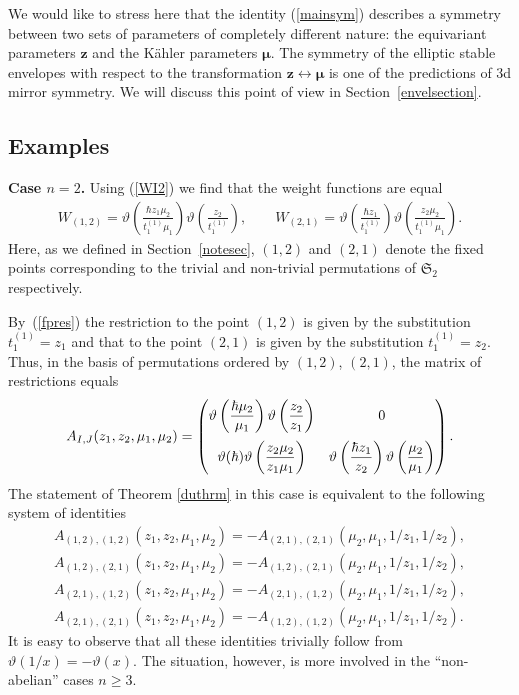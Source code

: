 \documentclass[10pt,a4paper]{amsart}
\def\zz{{\boldsymbol z}}
\def\mub{{\boldsymbol\mu}}
\let\thi\vartheta
\numberwithin{equation}{section}
\begin{document}
\begin{Note}
We would like to stress here that the identity (\ref{mainsym}) describes a symmetry between two sets of parameters of completely different nature: the
equivariant parameters $\zz$ and the K\"ahler parameters $\mub$. The symmetry of the elliptic stable envelopes with respect to the transformation $\zz\leftrightarrow \mub$ is one of the predictions of 3d mirror symmetry. We will discuss this point of view in Section~\ref{envelsection}.
\end{Note}

\subsection{Examples} \label{exsection}

\textbf{Case $n=2$.} Using (\ref{WI2}) we find that the weight functions are equal
\begin{gather*}
W_{(1,2)}=\thi \left( {\frac {\hbar z_{{1}}\mu_{{2}}}{t_{{1}}^{(1)} \mu_{{1}}}} \right)
\thi \left( {\frac {z_{{2}}}{t_1^{(1)} }} \right), \qquad W_{(2,1)}=\thi \left( {\frac {\hbar z_{{1}}}{t_1^{(1)} }} \right) \thi \left( {
 \frac {z_{{2}}\mu_{{2}}}{t_1^{(1)} \mu_{{1}}}} \right).
\end{gather*}
Here, as we defined in Section~\ref{notesec}, $(1,2)$ and $(2,1)$ denote the fixed points corresponding to the trivial and non-trivial permutations of $\mathfrak{S}_{2}$ respectively.

By~(\ref{fpres}) the restriction to the point $(1,2)$ is given by the substitution $t_1^{(1)} =z_{{1}}$ and that to the point $(2,1)$ is given by the substitution $t_1^{(1)} =z_{{2}}$. Thus, in the basis of permutations ordered by $(1,2)$, $(2,1)$, the matrix of restrictions equals
\begin{gather*}
A_{I,J}(z_1,z_2,\mu_1,\mu_2)=
\left( \begin{matrix} \thi \left( {\dfrac {\hbar \mu_{{2}}}{\mu_{{1}
}}} \right) \thi \left( {\dfrac {z_{{2}}}{z_{{1}}}} \right) & 0
\vspace{2mm}\\ \thi( \hbar ) \thi \left( {\dfrac {z_
 {{2}}\mu_{{2}}}{z_{{1}}\mu_{{1}}}} \right) & \thi \left( {\dfrac {\hbar z_
 {{1}}}{z_{{2}}}} \right) \thi \left( {\dfrac {\mu_{{2}}}{\mu_{{1}}}} \right) \end{matrix} \right).
\end{gather*}
The statement of Theorem \ref{duthrm} in this case is equivalent to the following system of identities
\begin{gather*}
A_{(1, 2), (1, 2)}(z_1,z_2,\mu_1,\mu_2) =- A_{(2, 1), (2, 1)}(\mu_2,\mu_1,1/z_1,1/z_2),\\
A_{(1, 2), (2, 1)}(z_1,z_2,\mu_1,\mu_2) =- A_{(1, 2), (2, 1)}(\mu_2,\mu_1,1/z_1,1/z_2),\\
A_{(2,1), (1, 2)}(z_1,z_2,\mu_1,\mu_2) =- A_{(2, 1), (1, 2)}(\mu_2,\mu_1,1/z_1,1/z_2),\\
A_{(2, 1), (2, 1)}(z_1,z_2,\mu_1,\mu_2) =- A_{(1, 2), (1, 2)}(\mu_2,\mu_1,1/z_1,1/z_2).
\end{gather*}
It is easy to observe that all these identities trivially follow from $\thi (1/x)=-\thi (x)$. The situation, however, is more involved in the ``non-abelian'' cases $n\geq 3$.
\end{document}
